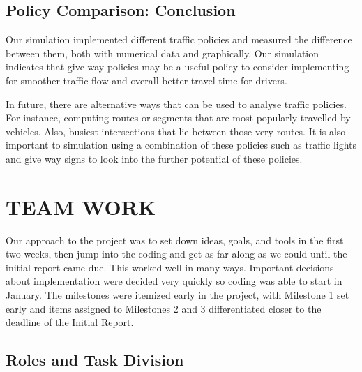 \documentclass[11pt]{article}
\begin{document}
\begin{enumerate}
\subsection{Policy Comparison: Conclusion}

Our simulation implemented different traffic policies and measured the difference between them, both with numerical data and graphically. Our simulation indicates that give way policies may be a useful policy to consider implementing for smoother traffic flow and overall better travel time for drivers.

In future, there are alternative ways that can be used to analyse traffic policies. For instance, computing routes or segments that are most popularly travelled by vehicles. Also, busiest intersections that lie between those very routes. It is also important to simulation using a combination of these policies such as traffic lights and give way signs to look into the further potential of these policies.




\section{TEAM WORK}

Our approach to the project was to set down ideas, goals, and tools in the first two weeks, then jump into the coding and get as far along as we could until the initial report came due. This worked well in many ways. Important decisions about implementation were decided very quickly so coding was able to start in January. The milestones were itemized early in the project, with Milestone 1 set early and items assigned to Milestones 2 and 3 differentiated closer to the deadline of the Initial Report.


\subsection{Roles and Task Division}


\end{enumerate}
\end{document}
